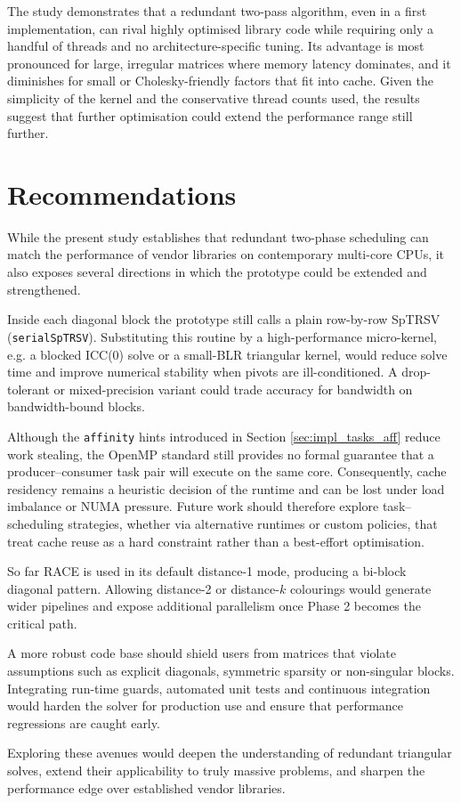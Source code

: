The study demonstrates that a redundant two-pass algorithm, even in a
first implementation, can rival highly optimised library code while
requiring only a handful of threads and no architecture-specific
tuning.  
Its advantage is most pronounced for large, irregular matrices where
memory latency dominates, and it diminishes for small or
Cholesky-friendly factors that fit into cache.  
Given the simplicity of the kernel and the conservative thread counts
used, the results suggest that further optimisation could extend the performance
range still further. 

\section{Recommendations}
\label{sec:recommendations}

While the present study establishes that redundant two-phase scheduling
can match the performance of vendor libraries on contemporary
multi-core CPUs, it also exposes several directions in which the
prototype could be extended and strengthened.

Inside each diagonal block the prototype still calls a plain row-by-row
SpTRSV (\texttt{serialSpTRSV}).  Substituting this routine by a
high-performance micro-kernel, e.g. a blocked ICC(0) solve or a small-BLR
triangular kernel, would reduce solve time and improve numerical
stability when pivots are ill-conditioned.  A drop-tolerant or mixed-precision variant could trade accuracy for bandwidth on bandwidth-bound blocks.

Although the \texttt{affinity} hints introduced in
Section \ref{sec:impl_tasks_aff} reduce work stealing, the OpenMP
standard still provides no formal guarantee that a
producer–consumer task pair will execute on the same core.  
Consequently, cache residency remains a heuristic decision of the
runtime and can be lost under load imbalance or NUMA pressure.
Future work should therefore explore task–scheduling strategies, 
whether via alternative runtimes or custom policies, that treat
cache reuse as a hard constraint rather than a
best-effort optimisation.

So far RACE is used in its default distance-1 mode, producing a
bi-block diagonal pattern.  Allowing distance-2 or distance-$k$
colourings would generate wider pipelines and expose additional
parallelism once Phase 2 becomes the critical path.  

A more robust code base should shield users from matrices that violate
assumptions such as explicit diagonals, symmetric sparsity or
non-singular blocks.  Integrating run-time guards, automated unit
tests and continuous integration would harden the solver for
production use and ensure that performance regressions are caught
early.

Exploring these avenues would deepen the understanding of redundant
triangular solves, extend their applicability to truly massive
problems, and sharpen the performance edge over established vendor
libraries.
